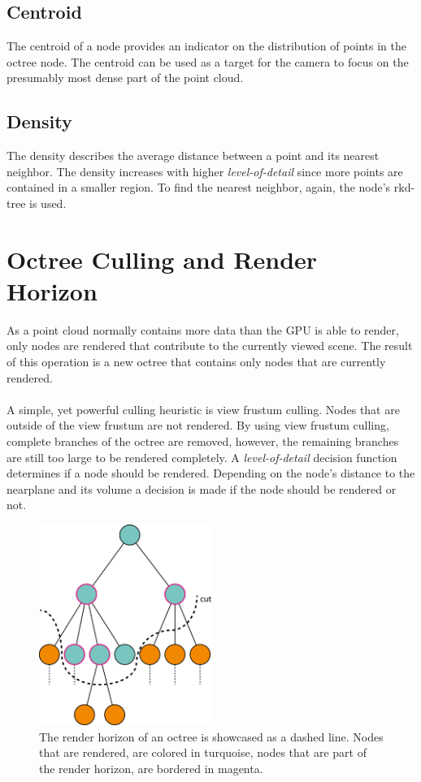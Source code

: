 \subsection{Centroid}

The centroid of a node provides an indicator on the distribution of points in the octree node. The centroid can be used as a target for the camera to focus on the presumably most dense part of the point cloud. 


\subsection{Density}

The density describes the average distance between a point and its nearest neighbor. The density increases with higher \textit{level-of-detail} since more points are contained in a smaller region. To find the nearest neighbor, again, the node's rkd-tree is used. 


\section{Octree Culling and Render Horizon}
\label{sec:renderHorizon}

As a point cloud normally contains more data than the GPU is able to render, only nodes are rendered that contribute to the currently viewed scene. The result of this operation is a new octree that contains only nodes that are currently rendered. 
\\
\\
A simple, yet powerful culling heuristic is view frustum culling. Nodes that are outside of the view frustum are not rendered. By using view frustum culling, complete branches of the octree are removed, however, the remaining branches are still too large to be rendered completely. A \textit{level-of-detail} decision function determines if a node should be rendered. Depending on the node's distance to the nearplane and its volume a decision is made if the node should be rendered or not. 

\begin{figure}
    \centering
    \includegraphics[width=0.5\textwidth]{Octree/renderHorizon.png}
    \caption{The render horizon of an octree is showcased as a dashed line. Nodes that are rendered, are colored in turquoise, nodes that are part of the render horizon, are bordered in magenta. }
    \label{fig:renderHorizon}
\end{figure}


